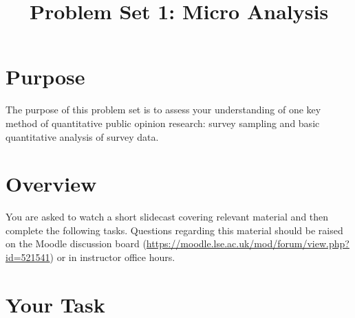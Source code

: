 \documentclass[a4paper]{exam}
\title{Problem Set 1: Micro Analysis}
\date{}
\begin{document}
\vspace{-4em}
\maketitle

\section{Purpose}\label{purpose}

The purpose of this problem set is to assess your understanding of one key method of quantitative public opinion research: survey sampling and basic quantitative analysis of survey data.

\section{Overview}\label{overview}

You are asked to watch a short slidecast covering relevant material and then complete the following tasks. Questions regarding this material should be raised on the Moodle discussion board (\url{https://moodle.lse.ac.uk/mod/forum/view.php?id=521541}) or in instructor office hours.

\section{Your Task}\label{your-task}
\end{document}

